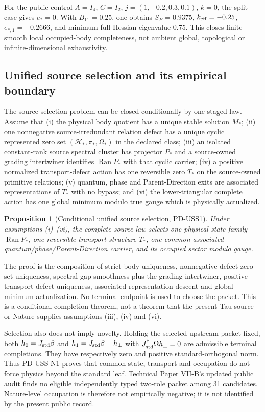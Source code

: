 \documentclass[11pt]{article}
\newtheorem{proposition}{Proposition}
\begin{document}
For the public control \(A=I_4\), \(C=I_2\),
\(j=(1,-0.2,0.3,0.1)\), \(k=0\), the split case gives \(e_*=0\).
With \(B_{11}=0.25\), one obtains \(S_E=0.9375\),
\(k_{\rm eff}=-0.25\), \(e_{*,1}=-0.266\overline6\), and minimum full-Hessian
eigenvalue \(0.75\). This closes finite smooth local occupied-body
completeness, not ambient global, topological or infinite-dimensional
exhaustivity.

\subsection{Unified source selection and its empirical boundary}

The source-selection problem can be closed conditionally by one staged law.
Assume that (i) the physical body quotient has a unique stable solution
$M_*$; (ii) one nonnegative source-irredundant relation defect has a unique
cyclic represented zero set $(\mathcal H_*,\pi_*,\Omega_*)$ in the declared
class; (iii) an isolated constant-rank source spectral cluster has projector
$P_*$ and a source-owned grading intertwiner identifies $\operatorname{Ran}P_*$
with that cyclic carrier; (iv) a positive normalized transport-defect action
has one reversible zero $T_*$ on the source-owned primitive relations; (v)
quantum, phase and Parent-Direction exits are associated representations of
$T_*$ with no bypass; and (vi) the lower-triangular complete action has one
global minimum modulo true gauge which is physically actualized.

\begin{proposition}[Conditional unified source selection, PD-USS1]
Under assumptions (i)--(vi), the complete source law selects one physical
state family $\operatorname{Ran}P_*$, one reversible transport structure
$T_*$, one common associated quantum/phase/Parent-Direction carrier, and its
occupied sector modulo gauge.
\end{proposition}

\noindent
The proof is the composition of strict body uniqueness, nonnegative-defect
zero-set uniqueness, spectral-gap smoothness plus the grading intertwiner,
positive transport-defect uniqueness, associated-representation descent and
global-minimum actualization. No terminal endpoint is used to choose the
packet. This is a conditional completion theorem, not a theorem that the
present Tau source or Nature supplies assumptions (iii), (iv) and (vi).

Selection also does not imply novelty. Holding the selected upstream packet
fixed, both $h_0=J_{\rm std}\beta$ and
$h_1=J_{\rm std}\beta+h_\perp$ with
$J_{\rm std}^{\dagger}\Omega h_\perp=0$ are admissible terminal completions.
They have respectively zero and positive standard-orthogonal norm. Thus
PD-USS-N1 proves that common state, transport and occupation do not force
physics beyond the standard leaf. Technical Paper VII-B's updated public
audit finds no eligible independently typed two-role packet among 31
candidates. Nature-level occupation is therefore not empirically negative;
it is not identified by the present public record.
\end{document}
